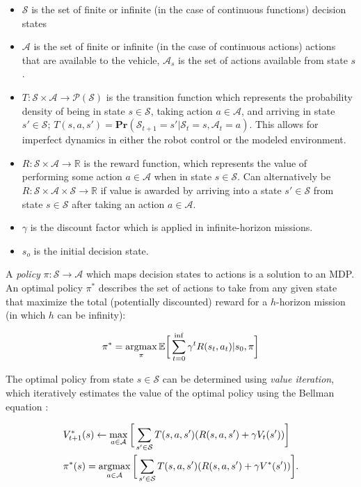 \begin{itemize}
	\item $\mathcal{S}$ is the set of finite or infinite (in the case of continuous functions) decision states
	\item $\mathcal{A}$ is the set of finite or infinite (in the case of continuous actions) actions that are available to the vehicle, $\mathcal{A}_s$ is the set of actions available from state $s$.
	\item $T : \mathcal{S} \times \mathcal{A} \to \mathcal{P}(\mathcal{S})$ is the transition function which represents the probability density of being in state $s \in \mathcal{S}$, taking action $a \in \mathcal{A}$, and arriving in state $s' \in \mathcal{S}$; $T(s,a,s') = \mathbf{Pr}(\mathcal{S}_{t+1} = s' | \mathcal{S}_t = s, \mathcal{A}_t = a)$. This allows for imperfect dynamics in either the robot control or the modeled environment.
	\item $R : \mathcal{S} \times \mathcal{A} \to \mathbb{R}$ is the reward function, which represents the value of performing some action $a \in \mathcal{A}$ when in state $s \in \mathcal{S}$. Can alternatively be $R : \mathcal{S} \times \mathcal{A} \times \mathcal{S} \to \mathbb{R}$ if value is awarded by arriving into a state $s' \in \mathcal{S}$ from state $s \in \mathcal{S}$ after taking an action $a \in \mathcal{A}$.
	\item $\gamma$ is the discount factor which is applied in infinite-horizon missions.
	\item $s_o$ is the initial decision state.
\end{itemize}

A \emph{policy} $\pi : \mathcal{S} \to \mathcal{A}$ which maps decision states to actions is a solution to an MDP.
An optimal policy $\pi^*$ describes the set of actions to take from any given state that maximize the total (potentially discounted) reward for a $h$-horizon mission (in which $h$ can be infinity):

\begin{equation}
\pi^* = \mathop\mathrm{arg max}_{\pi} \mathbb{E}\bigg[\sum_{t=0}^{\inf} \gamma^t R(s_t, a_t) | s_0, \pi\bigg]
\label{eq:optimal_policy}
\end{equation}

The optimal policy from state $s \in \mathcal{S}$ can be determined using \emph{value iteration}, which iteratively estimates the value of the optimal policy using the Bellman equation \autocite{bellman1957markovian}:

\begin{equation}
\begin{split}
&V_{t+1}^*(s) \leftarrow \max_{a \in \mathcal{A}}\bigg[\sum_{s' \in \mathcal{S}} T(s,a,s')(R(s,a,s') + \gamma V_t(s'))\bigg] \\
&\pi^*(s) = \mathop\mathrm{arg max}_{a \in \mathcal{A}}\bigg[\sum_{s' \in \mathcal{S}}T(s,a,s')(R(s,a,s') + \gamma V^*(s'))\bigg].
\end{split}
\end{equation}

